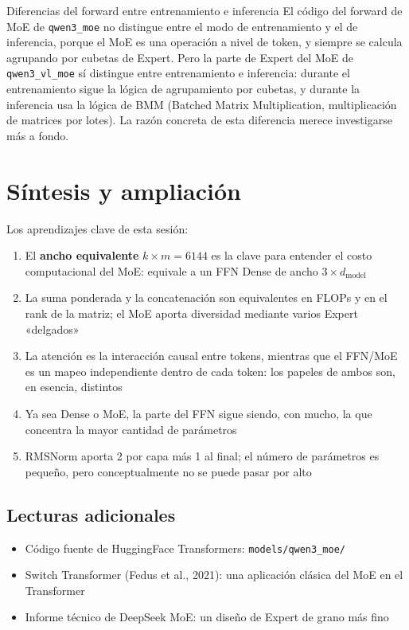\documentclass[a4paper]{article}
\begin{document}
\begin{knowledgebox}{Diferencias del forward entre entrenamiento e inferencia}
El código del forward de MoE de \texttt{qwen3\_moe} no distingue entre el modo de entrenamiento y el de inferencia, porque el MoE es una operación a nivel de token, y siempre se calcula agrupando por cubetas de Expert. Pero la parte de Expert del MoE de \texttt{qwen3\_vl\_moe} sí distingue entre entrenamiento e inferencia: durante el entrenamiento sigue la lógica de agrupamiento por cubetas, y durante la inferencia usa la lógica de BMM (Batched Matrix Multiplication, multiplicación de matrices por lotes). La razón concreta de esta diferencia merece investigarse más a fondo.
\end{knowledgebox}
\section{Síntesis y ampliación}

Los aprendizajes clave de esta sesión:

\begin{enumerate}
  \item El \textbf{ancho equivalente} $k \times m = 6144$ es la clave para entender el costo computacional del MoE: equivale a un FFN Dense de ancho $3 \times d_{\text{model}}$
  \item La suma ponderada y la concatenación son equivalentes en FLOPs y en el rank de la matriz; el MoE aporta diversidad mediante varios Expert «delgados»
  \item La atención es la interacción causal entre tokens, mientras que el FFN/MoE es un mapeo independiente dentro de cada token: los papeles de ambos son, en esencia, distintos
  \item Ya sea Dense o MoE, la parte del FFN sigue siendo, con mucho, la que concentra la mayor cantidad de parámetros
  \item RMSNorm aporta 2 por capa más 1 al final; el número de parámetros es pequeño, pero conceptualmente no se puede pasar por alto
\end{enumerate}

\subsection{Lecturas adicionales}

\begin{itemize}
  \item Código fuente de HuggingFace Transformers: \texttt{models/qwen3\_moe/}
  \item Switch Transformer (Fedus et al., 2021): una aplicación clásica del MoE en el Transformer
  \item Informe técnico de DeepSeek MoE: un diseño de Expert de grano más fino
\end{itemize}
\end{document}
